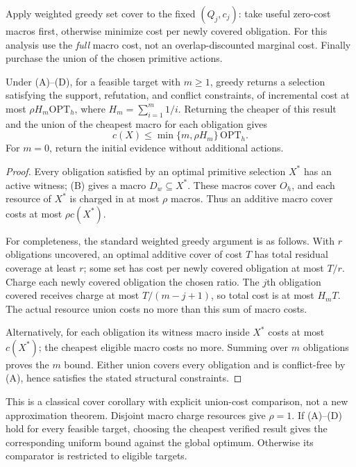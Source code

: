 Apply weighted greedy set cover to the fixed $(Q_j,c_j)$: take useful
zero-cost macros first, otherwise minimize cost per newly covered obligation.
For this analysis use the \emph{full} macro cost, not an overlap-discounted
marginal cost. Finally purchase the union of the chosen primitive actions.

\begin{proposition}
Under (A)--(D), for a feasible target with $m\geq1$, greedy returns a
selection satisfying the support, refutation, and conflict constraints,
of incremental cost at most $\rho H_m\mathrm{OPT}_h$, where
$H_m=\sum_{i=1}^m1/i$. Returning the cheaper of this result and the union of
the cheapest macro for each obligation gives
\[
 c(X)\leq\min\{m,\rho H_m\}\,\mathrm{OPT}_h.
\]
For $m=0$, return the initial evidence without additional actions.
\end{proposition}
\begin{proof}
Every obligation satisfied by an optimal primitive selection $X^*$ has an
active witness; (B) gives a macro $D_w\subseteq X^*$. These macros cover
$O_h$, and each resource of $X^*$ is charged in at most $\rho$ macros.
Thus an additive macro cover costs at most $\rho c(X^*)$.

For completeness, the standard weighted greedy argument
\citep{chvatal1979greedy} is as follows. With $r$ obligations uncovered, an
optimal additive cover of cost $T$ has total residual coverage at least $r$;
some set has cost per newly covered obligation at most $T/r$. Charge each
newly covered obligation the chosen ratio. The $j$th obligation covered
receives charge at most $T/(m-j+1)$, so total cost is at most $H_mT$.
The actual resource union costs no more than this sum of macro costs.

Alternatively, for each obligation its witness macro inside $X^*$ costs at
most $c(X^*)$; the cheapest eligible macro costs no more. Summing over $m$
obligations proves the $m$ bound. Either union covers every obligation and
is conflict-free by (A), hence satisfies the stated structural constraints.
\end{proof}

This is a classical cover corollary with explicit union-cost comparison,
not a new approximation theorem. Disjoint macro charge resources give
$\rho=1$. If (A)--(D) hold for every feasible target, choosing the cheapest
verified result gives the corresponding uniform bound against the global
optimum. Otherwise its comparator is restricted to eligible targets.

